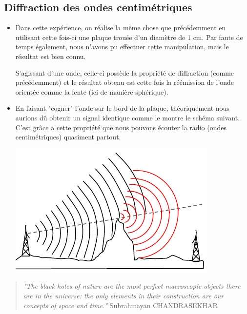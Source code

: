 \documentclass[12pt,a4paper]{article}
\begin{document}
	\subsection{Diffraction des ondes centimétriques}
	\begin{itemize}[label=$\circ$]
		\item Dans cette expérience, on réalise la même chose que précédemment en utilisant cette fois-ci une plaque trouée d'un diamètre de 1 cm. Par faute de temps également, nous n'avons pu effectuer cette manipulation, mais le résultat est bien connu. 
		
		S'agissant d'une onde, celle-ci possède la propriété de diffraction (comme précédemment) et le résultat obtenu est cette fois la réémission de l'onde orientée comme la fente (ici de manière sphérique).
		
		\item En faisant "cogner" l'onde sur le bord de la plaque, théoriquement nous aurions dû obtenir un signal identique comme le montre le schéma suivant. C'est grâce à cette propriété que nous pouvons écouter la radio (ondes centimétriques) quasiment partout. 
		\begin{center}
			\includegraphics[scale=0.5]{schem4}
			
		\end{center}
	\end{itemize} 
	\begin{quotation}
		\textit{"The black holes of nature are the most perfect macroscopic objects there are in the universe: the only elements in their construction are our concepts of space and time."} Subrahmayan CHANDRASEKHAR
	\end{quotation}
	
\end{document}
